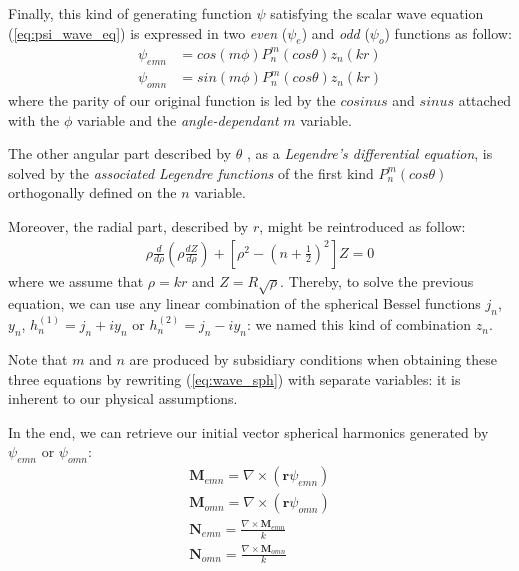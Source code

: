 \documentclass{article}
\begin{document}
Finally, this kind of generating function $\psi$ satisfying the scalar wave equation (\ref{eq:psi_wave_eq}) is expressed in two \textit{even} ($\psi_{e}$) and \textit{odd} ($\psi_{o}$) functions as follow:
\begin{align}
\psi_{emn}&=cos(m\phi)P_{n}^{m}(cos\theta)z_{n}(kr)\\
\psi_{omn}&=sin(m\phi)P_{n}^{m}(cos\theta)z_{n}(kr)
\end{align}
where the parity of our original function is led by the $cosinus$ and $sinus$ attached with the $\phi$ variable and the \textit{angle-dependant} $m$ variable. 

The other angular part described by $\theta$ , as a \textit{Legendre's differential equation}, is solved by the \textit{associated Legendre functions} of the first kind $P_{n}^{m}(cos\theta)$ orthogonally defined on the $n$ variable. 

Moreover, the radial part, described by $r$, might be reintroduced as follow:
\begin{align}
\rho\frac{d }{d\rho}(\rho\frac{d Z}{d\rho})+[\rho^{2}-(n+\frac{1}{2})^{2}]Z=0
\end{align}
where we assume that $\rho=kr$ and $Z=R\sqrt{\rho}$. Thereby, to solve the previous equation, we can use any linear combination of the spherical Bessel functions $j_{n}$, $y_{n}$, $h^{(1)}_{n}=j_{n}+iy_{n}$ or $h^{(2)}_{n}=j_{n}-iy_{n}$: we named this kind of combination $z_{n}$.

Note that $m$ and $n$ are produced by subsidiary conditions when obtaining these three equations by rewriting (\ref{eq:wave_sph}) with separate variables: it is inherent to our physical assumptions.

In the end, we can retrieve our initial vector spherical harmonics generated by $\psi_{emn}$ or $\psi_{omn}$:
\begin{align}
\textbf{M}_{emn}=\nabla \times (\textbf{r}\psi_{emn})\\
\textbf{M}_{omn}=\nabla \times (\textbf{r}\psi_{omn})\\
\textbf{N}_{emn}=\frac{\nabla \times \textbf{M}_{emn}}{k}\\
\textbf{N}_{omn}=\frac{\nabla \times \textbf{M}_{omn}}{k}
\end{align}
\end{document}
